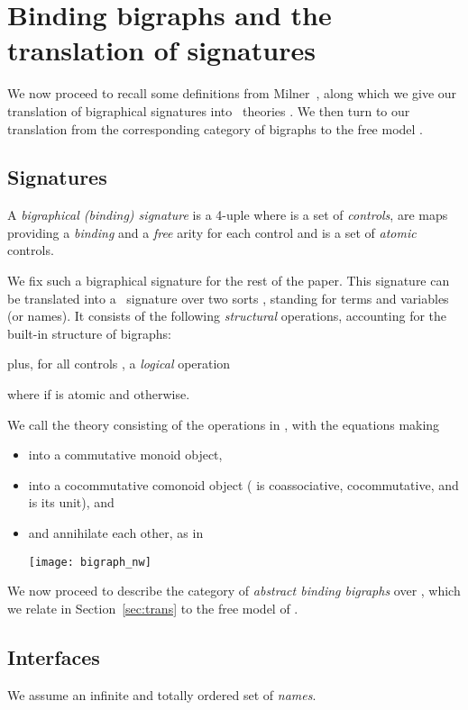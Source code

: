 \documentclass{llncs}
\newcommand{\intro}[1]{\emph{#1}}
\begin{document}
\section{Binding bigraphs and the translation of signatures}\label{sec:big}
We now proceed to recall some definitions from Milner~\cite{Milner:bigraphs}, along which we give our translation of
bigraphical signatures  into \smc\ theories . We
then turn to our translation from the corresponding category of
bigraphs to the free model .

\subsection{Signatures}
\label{bigraph:sig}
\begin{definition}
  A \intro{bigraphical (binding) signature} is a 4-uple  where  is a set of \intro{controls},  are maps providing a \emph{binding} and a
  \emph{free} arity for each control and  is a set
  of \emph{atomic} controls.
\end{definition}
We fix such a bigraphical signature  for the rest of the paper. 
This signature can be translated into a \smc\ signature  over two
sorts , standing for terms and variables (or names).
It consists of the following \emph{structural} operations, accounting for the
built-in structure of bigraphs:

plus, for all controls , a \emph{logical} operation
 
where  if  is atomic and  otherwise.

We call  the theory consisting
of the operations in , with the equations making
\begin{itemize}
\item  into a commutative monoid object, 
\item  into a cocommutative comonoid object ( is
  coassociative, cocommutative, and  is its unit), and
\item  and  annihilate each other, as in
	\begin{center}
	    \texttt{[image: bigraph\_nw]} 
	\end{center}
\end{itemize}
We now proceed to describe the category  of
\emph{abstract binding bigraphs} over , which we relate in
Section~\ref{sec:trans} to the free model  of
.

\subsection{Interfaces}
We assume an infinite and totally ordered set  of \emph{names}. 
\end{document}
